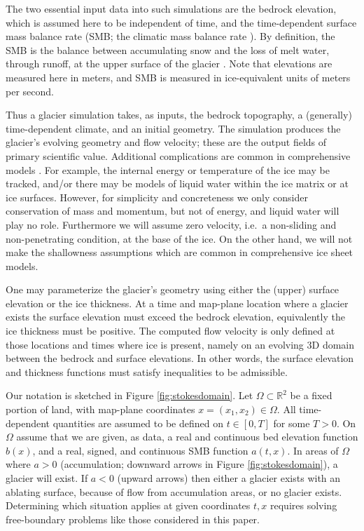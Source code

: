 \documentclass[hidelinks,onefignum,onetabnum,final]{siamart220329}  %
\newcommand{\RR}{\mathbb{R}}
\begin{document}
The two essential input data into such simulations are the bedrock elevation, which is assumed here to be independent of time, and the time-dependent surface mass balance rate (SMB; the climatic mass balance rate \cite{Cogleyetal2011}).  By definition, the SMB is the balance between accumulating snow and the loss of melt water, through runoff, at the upper surface of the glacier \cite{Cogleyetal2011}.  Note that elevations are measured here in meters, and SMB is measured in ice-equivalent units of meters per second.

Thus a glacier simulation takes, as inputs, the bedrock topography, a (generally) time-dependent climate, and an initial geometry.  The simulation produces the glacier's evolving geometry and flow velocity; these are the output fields of primary scientific value.  Additional complications are common in comprehensive models \cite{SchoofHewitt2013,Winkelmannetal2011}.  For example, the internal energy \cite{Aschwandenetal2012} or temperature of the ice may be tracked, and/or there may be models of liquid water within the ice matrix or at ice surfaces.  However, for simplicity and concreteness we only consider conservation of mass and momentum, but not of energy, and liquid water will play no role.  Furthermore we will assume zero velocity, i.e.~a non-sliding and non-penetrating condition, at the base of the ice.  On the other hand, we will not make the shallowness assumptions which are common in comprehensive ice sheet models.

One may parameterize the glacier's geometry using either the (upper) surface elevation or the ice thickness.  At a time and map-plane location where a glacier exists the surface elevation must exceed the bedrock elevation, equivalently the ice thickness must be positive.  The computed flow velocity is only defined at those locations and times where ice is present, namely on an evolving 3D domain between the bedrock and surface elevations.  In other words, the surface elevation and thickness functions must satisfy inequalities to be admissible.

Our notation is sketched in Figure \ref{fig:stokesdomain}.  Let $\Omega \subset \RR^2$ be a fixed portion of land, with map-plane coordinates $x=(x_1,x_2)\in\Omega$.  All time-dependent quantities are assumed to be defined on $t\in [0,T]$ for some $T>0$.  On $\Omega$ assume that we are given, as data, a real and continuous bed elevation function $b(x)$, and a real, signed, and continuous SMB function $a(t,x)$.  In areas of $\Omega$ where $a>0$ (accumulation; downward arrows in Figure \ref{fig:stokesdomain}), a glacier will exist.  If $a<0$ (upward arrows) then either a glacier exists with an ablating surface, because of flow from accumulation areas, or no glacier exists.  Determining which situation applies at given coordinates $t,x$ requires solving free-boundary problems like those considered in this paper.
\end{document}

